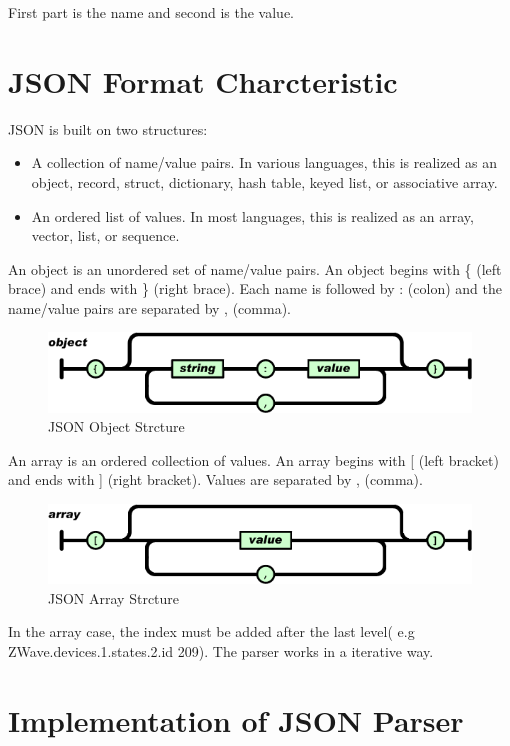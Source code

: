 First part is the name and second is the value.
\section{JSON Format Charcteristic}
JSON is built on two structures:

\begin{itemize}
  \item A collection of name/value pairs. In various languages, this is realized as an object, record, struct, dictionary, hash table, keyed list, or associative array.
  \item An ordered list of values. In most languages, this is realized as an array, vector, list, or sequence.
\end{itemize}
An object is an unordered set of name/value pairs. An object begins with \{ (left brace) and ends with \} (right brace). Each name is followed by : (colon) and the name/value pairs are separated by , (comma).

\begin{figure}[htbp]
	\centering
		\includegraphics[width=12cm]{Figures/jsonobject.png}
	\caption[JSON Object Strcture]{JSON Object Strcture}
\end{figure}

An array is an ordered collection of values. An array begins with [ (left bracket) and ends with ] (right bracket). Values are separated by , (comma).
\begin{figure}[htbp]
	\centering
		\includegraphics[width=12cm]{Figures/jsonarray.png}
	\caption[JSON Array Strcture]{JSON Array Strcture}
\end{figure}

In the array case, the index must be added after the last level( e.g ZWave.devices.1.states.2.id 209). The parser works in a iterative way.

\section{Implementation of JSON Parser}

